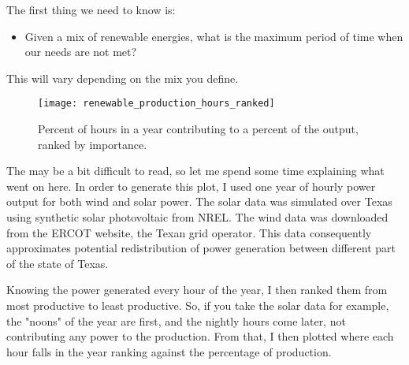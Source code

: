 
The first thing we need to know is:

\begin{itemize}
\item Given a mix of renewable energies, what is the maximum period of time when our needs are not met?
\end{itemize}

This will vary depending on the mix you define.


\begin{figure}[ht]
	\texttt{[image: renewable\_production\_hours\_ranked]}
	\caption[Percent of hours in a year contributing to a percent of the output, ranked by importance]{Percent of hours in a year contributing to a percent of the output, ranked by importance.}
\end{figure}

The  may be a bit difficult to read, so let me spend some time explaining what went on here. In order to generate this plot, I used one year of hourly power output for both wind and solar power. The solar data was simulated over Texas using synthetic solar photovoltaic from NREL. The wind data was downloaded from the ERCOT website, the Texan grid operator. This data consequently approximates potential redistribution of power generation between different part of the state of Texas.

Knowing the power generated every hour of the year, I then ranked them from most productive to least productive. So, if you take the solar data for example, the "noons" of the year are first, and the nightly hours come later, not contributing any power to the production. From that, I then plotted where each hour falls in the year ranking against the percentage of production.

